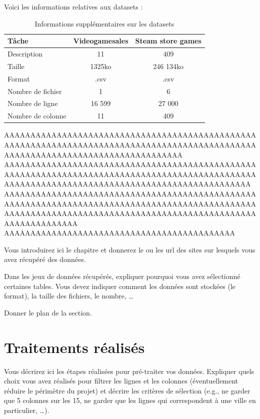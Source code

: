 \documentclass[mstat,12pt]{unswthesis}
\begin{document}
Voici les informations relatives aux datasets :


\begin{table}[H]
\centering
\begin{tabular}{|l|c|c|}
\hline
\textbf{Tâche} & \textbf{Videogamesales} & \textbf{Steam store games} \\
\hline
Description & 11 & 409 \\
\hline
Taille & 1325ko & 246 134ko \\
\hline
Format & .csv & .csv \\
\hline
Nombre de fichier & 1 & 6 \\
\hline
Nombre de ligne & 16 599 & 27 000 \\
\hline
Nombre de colonne & 11 & 409 \\
\hline
\end{tabular}
\caption{Informations supplémentaires sur les datasets}
\end{table}


AAAAAAAAAAAAAAAAAAAAAAAAAAAAAAAAAAAAAAAAAAAAAAAAAAAAAAAAAAAAAAAAAAAAAAAAAAAAAAAAAAAAAAAAAAAAAAAAAAAAAAAAAAAAAAAAAAAAAAAAAAAAAAAAAA
AAAAAAAAAAAAAAAAAAAAAAAAAAAAAAAAAAAAAAAAAAAAAAAAAAAAAAAAAAAAAAAAAAAAAAAAAAAAAAAAAAAAAAAAAAAAAAAAAAAAAAAAAAAAAAAAAAAAAAAAAAAAAAAAAAAAAAAAAAAAAAA
AAAAAAAAAAAAAAAAAAAAAAAAAAAAAAAAAAAAAAAAAAAAAAAAAAAAAAAAAAAAAAAAAAAAAAAAAAAAAAAAAAAAAAAAAAAAAAAAAAAAAAAAAAAAAAAAAAAAAAAAAAAAAAAAAAAAAAAAAAAAAAAAAAAAAAAAAAAAAA
AAAAAAAAAAAAAAAAAAAAAAAAAAAAAAAAAAAAAAAAAAAA

Vous introduirez ici le chapitre et donnerez le ou les url des sites sur lesquels vous avez récupéré des données.
 
  Dans les jeux de données récupérés, expliquer pourquoi vous avez
  sélectionné certaines tables. Vous devez indiquer
  comment les données sont stockées (le format), la taille des fichiers,
  le nombre, \ldots{}
  
  Donner le plan de la section.


\hypertarget{descriptifTraitementBD}{%
\section{Traitements réalisés}\label{traitementBD}}

Vous décrirez ici les étapes réalisées pour pré-traiter vos données. Expliquer quels choix vous avez réalisés pour filtrer les lignes et
  les colonnes (éventuellement réduire le périmètre du projet) et
  décrire les critères de sélection (e.g., ne garder que 5 colonnes sur
  les 15, ne garder que les lignes qui correspondent à une ville en
  particulier, \ldots).
\end{document}
